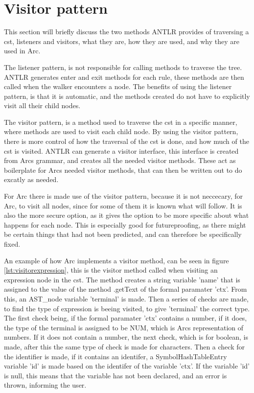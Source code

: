 \section{Visitor pattern}\label{sec:visitorpattern}
This section will briefly discuss the two methods ANTLR provides of traversing a \gls{cst}, listeners and visitors, what they are, how they are used, and why they are used in Arc. 

The listener pattern, is not responsible for calling methods to traverse the tree. ANTLR generates enter and exit methods for each rule, these methods are then called when the walker encounters a node. The benefits of using the listener pattern, is that it is automatic, and the methods created do not have to explicitly visit all their child nodes\cite{Parr2014}. 

The visitor pattern, is a method used to traverse the \gls{cst} in a specific manner, where methods are used to visit each child node. By using the visitor pattern, there is more control of how the traversal of the \gls{cst} is done, and how much of the \gls{cst} is visited. ANTLR can generate a visitor interface, this interface is created from Arcs grammar, and creates all the needed visitor methods. These act as boilerplate for Arcs needed visitor methods, that can then be written out to do excatly as needed\cite{Parr2014}.

For Arc there is made use of the visitor pattern, because it is not neccecary, for Arc, to visit all nodes, since for some of them it is known what will follow. It is also the more secure option, as it gives the option to be more specific about what happens for each node. This is especially good for futureproofing, as there might be certain things that had not been predicted, and can therefore be specifically fixed.

An example of how Arc implements a visitor method, can be seen in figure \ref{lst:visitorexpression}, this is the visitor method called when visiting an expression node in the \gls{cst}. The method creates a string variable 'name' that is assigned to the value of the method .getText of the formal paramater 'ctx'. From this, an AST\_node variable 'terminal' is made. Then a series of checks are made, to find the type of expression is beeing visited, to give 'terminal' the correct type. The first check being, if the formal paramater 'ctx' contains a number, if it does, the type of the terminal is assigned to be NUM, which is Arcs representation of numbers. If it does not contain a number, the next check, which is for boolean, is made, after this the same type of check is made for characters. Then a check for the identifier is made, if it contains an identifer, a SymbolHashTableEntry variable 'id' is made based on the identifer of the variable 'ctx'. If the variable 'id' is null, this means that the variable has not been declared, and an error is thrown, informing the user. 

